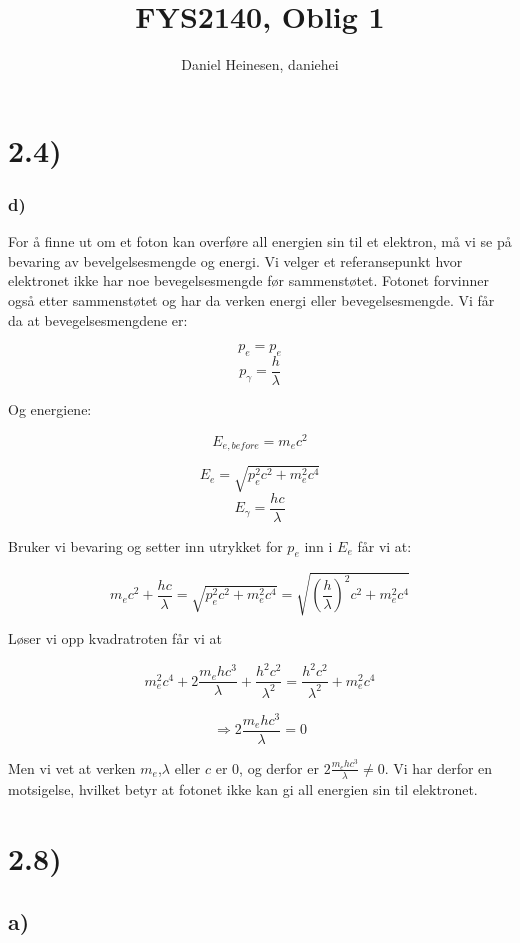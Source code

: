 \documentclass[a4paper,norsk, 10pt]{article}
\title{FYS2140, Oblig 1}
\author{Daniel Heinesen, daniehei}
\begin{document}
\maketitle

\section*{2.4)}


\subsubsection*{d)}\label{subsec::overforingAvAllEnergi}
For å finne ut om et foton kan overføre all energien sin til et elektron, må vi se på bevaring av bevelgelsesmengde og energi. Vi velger et referansepunkt hvor elektronet ikke har noe bevegelsesmengde før sammenstøtet. Fotonet forvinner også etter sammenstøtet og har da verken energi eller bevegelsesmengde. Vi får da at bevegelsesmengdene er:

$$
p_e = p_e
$$
$$
p_{\gamma} = \frac{h}{\lambda}
$$

Og energiene:

$$
E_{e,before} = m_ec^2
$$

$$
E_e = \sqrt{p_e^2c^2 + m_e^2c^4}
$$
$$
E_{\gamma} = \frac{hc}{\lambda}
$$

Bruker vi bevaring og setter inn utrykket for $p_e$ inn i $E_e$ får vi at:

$$
m_ec^2 + \frac{hc}{\lambda} = \sqrt{p_e^2c^2 + m_e^2c^4} = \sqrt{(\frac{h}{\lambda})^2c^2 + m_e^2c^4}
$$

Løser vi opp kvadratroten får vi at

$$
m_e^2c^4 +2\frac{m_ehc^3}{\lambda} + \frac{h^2c^2}{\lambda^2} = \frac{h^2c^2}{\lambda^2} + m_e^2c^4
$$

$$
\Rightarrow 2\frac{m_ehc^3}{\lambda} = 0
$$

Men vi vet at verken $m_e$,$\lambda$ eller $c$ er $0$, og derfor er $2\frac{m_ehc^3}{\lambda} \ne 0$. Vi har derfor en motsigelse, hvilket betyr at fotonet ikke kan gi all energien sin til elektronet.

\section*{2.8)}

\subsection*{a)}
\end{document}
